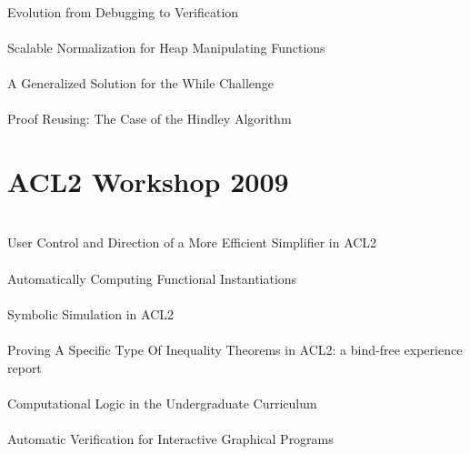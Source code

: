 \documentclass{article}
\begin{document}
\cite{07-rimlinger-evolution} \\
Evolution from Debugging to Verification \\

\cite{07-greve-heap} \\
Scalable Normalization for Heap Manipulating Functions \\

\cite{07-ray-challenge} \\
A Generalized Solution for the While Challenge \\

\cite{07-sotes-hindley} \\
Proof Reusing: The Case of the {Hindley} Algorithm \\


\section{ACL2 Workshop 2009}

\cite{09-sumners-simplifier} \\
User Control and Direction of a More Efficient Simplifier in {ACL2} \\

\cite{09-moore-instantiations} \\
Automatically Computing Functional Instantiations \\

\cite{09-boyer-simulation} \\
Symbolic Simulation in {ACL2} \\

\cite{09-liu-inequality} \\
Proving A Specific Type Of Inequality Theorems in {ACL2}: a bind-free experience report \\

\cite{09-page-curriculum} \\
Computational Logic in the Undergraduate Curriculum \\

\cite{09-eastlund-interactive} \\
Automatic Verification for Interactive Graphical Programs \\
\end{document}
